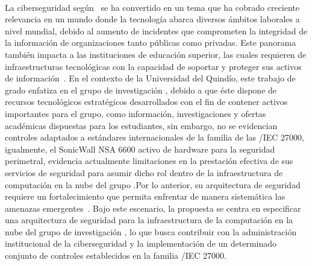 \label{cap:justificacion}
\mbox{}\\

\noindent
La ciberseguridad según~\cite{lallie2025universitycyber} se ha convertido en un tema que ha cobrado creciente relevancia 
en un mundo donde la tecnología abarca diversos ámbitos laborales a nivel mundial, debido al aumento de incidentes que comprometen 
la integridad de la información de organizaciones tanto públicas como privadas. Este panorama también impacta a las instituciones 
de educación superior, las cuales requieren de infraestructuras tecnológicas con la capacidad de soportar y proteger sus activos de 
información~\cite{educause2023cyberhighered}. En el contexto de la Universidad del Quindío, este trabajo de grado enfatiza en el grupo 
de investigación \GRID, debido a que éste dispone de recursos tecnológicos estratégicos desarrollados con el fin de contener activos 
importantes para el grupo, como información, investigaciones y ofertas académicas dispuestas para los estudiantes, sin embargo, no 
se evidencian controles adaptados a estándares internacionales de la familia de las \ISO/IEC 27000, igualmente, el \UTM SonicWall NSA 
6600 activo de hardware para la seguridad perimetral, evidencia actualmente limitaciones en la prestación efectiva de sus servicios 
de seguridad para asumir dicho rol dentro de la infraestructura de computación en la nube del grupo \GRID.\@ Por lo anterior, su 
arquitectura de seguridad requiere un fortalecimiento que permita enfrentar de manera sistemática las amenazas 
emergentes~\cite{edutech2025studentdata}. Bajo este escenario, la propuesta se centra en especificar una arquitectura de seguridad 
para la infraestructura de la computación en la nube del grupo de investigación \GRID, lo que busca contribuir con la administración 
institucional de la ciberseguridad y la implementación de un determinado conjunto de controles establecidos en la familia \ISO/IEC 27000.

